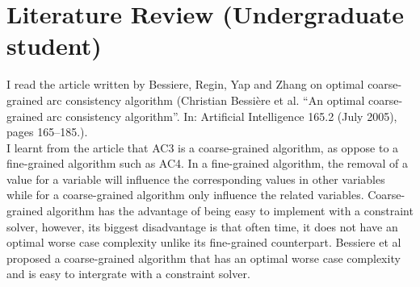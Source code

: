 \documentclass[9.5pt]{extarticle}
\begin{document}
\begin{table}[H]
\centering
\caption{Experiements performed to measure number of constrainsts checked with various heuristic}
\label{my-label}
\end{table}

\section{Literature Review (Undergraduate student)}

I read the article written by Bessiere, Regin, Yap and Zhang on optimal coarse-grained arc consistency algorithm (Christian Bessière et al. “An optimal coarse-grained arc consistency algorithm”. In: Artificial Intelligence 165.2 (July 2005), pages 165–185.).\\

I learnt from the article that AC3 is a coarse-grained algorithm, as oppose to a fine-grained algorithm such as AC4. In a fine-grained algorithm, the removal of a value for a variable will influence the corresponding values in other variables while for a coarse-grained algorithm only influence the related variables. Coarse-grained algorithm has the advantage of being easy to implement with a constraint solver, however, its biggest disadvantage is that often time, it does not have an optimal worse case complexity unlike its fine-grained counterpart. Bessiere et al proposed a coarse-grained algorithm that has an optimal worse case complexity and is easy to intergrate with a constraint solver.\\
\end{document}
